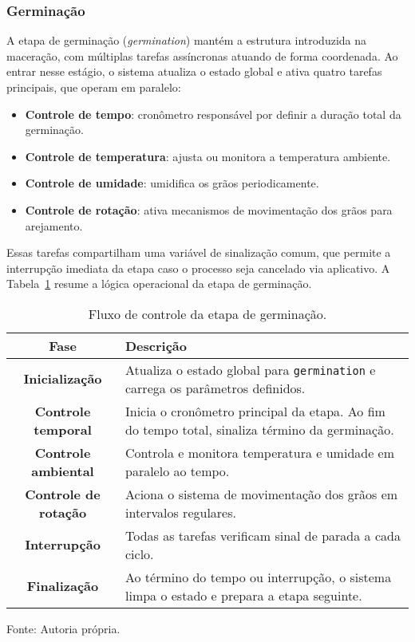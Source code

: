 \subsubsection{Germinação}

A etapa de germinação (\textit{germination}) mantém a estrutura introduzida na maceração, com múltiplas tarefas assíncronas atuando de forma coordenada. Ao entrar nesse estágio, o sistema atualiza o estado global e ativa quatro tarefas principais, que operam em paralelo:

\begin{itemize}
    \item \textbf{Controle de tempo}: cronômetro responsável por definir a duração total da germinação.
    \item \textbf{Controle de temperatura}: ajusta ou monitora a temperatura ambiente.
    \item \textbf{Controle de umidade}: umidifica os grãos periodicamente.
    \item \textbf{Controle de rotação}: ativa mecanismos de movimentação dos grãos para arejamento.
\end{itemize}

Essas tarefas compartilham uma variável de sinalização comum, que permite a interrupção imediata da etapa caso o processo seja cancelado via aplicativo. A Tabela~\ref{tab:germinacao_fluxo} resume a lógica operacional da etapa de germinação.

\begin{table}[ht]
    \caption{Fluxo de controle da etapa de germinação.}
    \label{tab:germinacao_fluxo}
    \centering
    \begin{tabular}{>{\bfseries}c p{10cm}}
        \hline
        Fase & Descrição \\
        \hline
        Inicialização & Atualiza o estado global para \texttt{germination} e carrega os parâmetros definidos. \\
        Controle temporal & Inicia o cronômetro principal da etapa. Ao fim do tempo total, sinaliza término da germinação. \\
        Controle ambiental & Controla e monitora temperatura e umidade em paralelo ao tempo. \\
        Controle de rotação & Aciona o sistema de movimentação dos grãos em intervalos regulares. \\
        Interrupção & Todas as tarefas verificam sinal de parada a cada ciclo. \\
        Finalização & Ao término do tempo ou interrupção, o sistema limpa o estado e prepara a etapa seguinte. \\
        \hline
    \end{tabular}

    {\centering\footnotesize Fonte: Autoria própria.\par}
\end{table}

